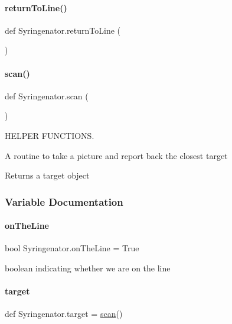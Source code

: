 \paragraph{\texorpdfstring{returnToLine()}{returnToLine()}}
{\footnotesize\ttfamily def Syringenator.\+return\+To\+Line (\begin{DoxyParamCaption}{ }\end{DoxyParamCaption})}

\mbox{\label{namespaceSyringenator_aff01237d3ff3e33f0ffc32927d813df0}} 
\paragraph{\texorpdfstring{scan()}{scan()}}
{\footnotesize\ttfamily def Syringenator.\+scan (\begin{DoxyParamCaption}{ }\end{DoxyParamCaption})}



H\+E\+L\+P\+ER F\+U\+N\+C\+T\+I\+O\+NS. 

A routine to take a picture and report back the closest target \begin{DoxyReturn}{Returns}
a target object 
\end{DoxyReturn}


\subsubsection{Variable Documentation}
\mbox{\label{namespaceSyringenator_a161fa877b77c9ebb120c1ed20739260b}} 
\paragraph{\texorpdfstring{onTheLine}{onTheLine}}
{\footnotesize\ttfamily bool Syringenator.\+on\+The\+Line = True}



boolean indicating whether we are on the line 

\mbox{\label{namespaceSyringenator_a66c7999289f77a4adce05169661f9660}} 
\paragraph{\texorpdfstring{target}{target}}
{\footnotesize\ttfamily def Syringenator.\+target = \mbox{\hyperlink{namespaceSyringenator_aff01237d3ff3e33f0ffc32927d813df0}{scan}}()}


